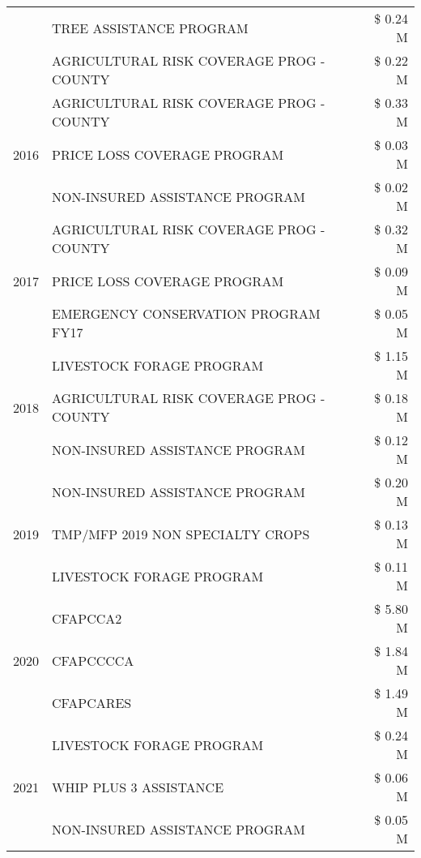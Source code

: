 \begin{tabular}{llr}
 & TREE ASSISTANCE PROGRAM & \$ 0.24 M \\
 & AGRICULTURAL RISK COVERAGE PROG - COUNTY & \$ 0.22 M \\
\cline{1-3}
\multirow[t]{3}{*}{2016} & AGRICULTURAL RISK COVERAGE PROG - COUNTY      & \$ 0.33 M \\
 & PRICE LOSS COVERAGE PROGRAM                   & \$ 0.03 M \\
 & NON-INSURED ASSISTANCE PROGRAM                & \$ 0.02 M \\
\cline{1-3}
\multirow[t]{3}{*}{2017} & AGRICULTURAL RISK COVERAGE PROG - COUNTY & \$ 0.32 M \\
 & PRICE LOSS COVERAGE PROGRAM & \$ 0.09 M \\
 & EMERGENCY CONSERVATION PROGRAM FY17 & \$ 0.05 M \\
\cline{1-3}
\multirow[t]{3}{*}{2018} & LIVESTOCK FORAGE PROGRAM & \$ 1.15 M \\
 & AGRICULTURAL RISK COVERAGE PROG - COUNTY & \$ 0.18 M \\
 & NON-INSURED ASSISTANCE PROGRAM & \$ 0.12 M \\
\cline{1-3}
\multirow[t]{3}{*}{2019} & NON-INSURED ASSISTANCE PROGRAM & \$ 0.20 M \\
 & TMP/MFP 2019 NON SPECIALTY CROPS & \$ 0.13 M \\
 & LIVESTOCK FORAGE PROGRAM & \$ 0.11 M \\
\cline{1-3}
\multirow[t]{3}{*}{2020} & CFAPCCA2 & \$ 5.80 M \\
 & CFAPCCCCA & \$ 1.84 M \\
 & CFAPCARES & \$ 1.49 M \\
\cline{1-3}
\multirow[t]{3}{*}{2021} & LIVESTOCK FORAGE PROGRAM & \$ 0.24 M \\
 & WHIP PLUS 3 ASSISTANCE & \$ 0.06 M \\
 & NON-INSURED ASSISTANCE PROGRAM & \$ 0.05 M \\
\cline{1-3}
\bottomrule
\end{tabular}
